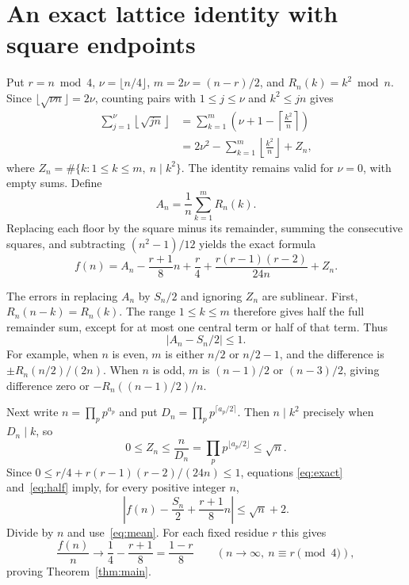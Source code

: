 \documentclass[11pt]{article}
\newcommand{\fl}[1]{\left\lfloor#1\right\rfloor}
\begin{document}
\section*{An exact lattice identity with square endpoints}
Put $r=n\bmod4$, $\nu=\lfloor n/4\rfloor$, $m=2\nu=(n-r)/2$,
and $R_n(k)=k^2\bmod n$. Since
$\lfloor\sqrt{\nu n}\rfloor=2\nu$, counting pairs with
$1\le j\le\nu$ and $k^2\le jn$ gives
\begin{align*}
 \sum_{j=1}^{\nu}\fl{\sqrt{jn}}
 &=\sum_{k=1}^{m}\left(\nu+1-\left\lceil\frac{k^2}{n}\right\rceil\right)\\
 &=2\nu^2-\sum_{k=1}^{m}\fl{\frac{k^2}{n}}+Z_n,
\end{align*}
where $Z_n=\#\{k:1\le k\le m,\ n\mid k^2\}$.
The identity remains valid for $\nu=0$, with empty sums.
Define
\[
 A_n=\frac1n\sum_{k=1}^{m}R_n(k).
\]
Replacing each floor by the square minus its remainder, summing the
consecutive squares, and subtracting $(n^2-1)/12$ yields the exact formula
\begin{equation}\label{eq:exact}
 f(n)=A_n-\frac{r+1}{8}n+\frac r4+
              \frac{r(r-1)(r-2)}{24n}+Z_n.
\end{equation}

The errors in replacing $A_n$ by $S_n/2$ and ignoring $Z_n$ are
sublinear. First, $R_n(n-k)=R_n(k)$. The range $1\le k\le m$
therefore gives half the full remainder sum, except for at most one
central term or half of that term. Thus
\begin{equation}\label{eq:half}
 |A_n-S_n/2|\le1.
\end{equation}
For example, when $n$ is even, $m$ is either $n/2$ or $n/2-1$,
and the difference is $\pm R_n(n/2)/(2n)$. When $n$ is odd, $m$
is $(n-1)/2$ or $(n-3)/2$, giving difference zero or
$-R_n((n-1)/2)/n$.

Next write $n=\prod_p p^{a_p}$ and put
$D_n=\prod_p p^{\lceil a_p/2\rceil}$. Then $n\mid k^2$ precisely
when $D_n\mid k$, so
\[
 0\le Z_n\le\frac n{D_n}
 =\prod_p p^{\lfloor a_p/2\rfloor}\le\sqrt n.
\]
Since $0\le r/4+r(r-1)(r-2)/(24n)\le1$, equations
\eqref{eq:exact} and~\eqref{eq:half} imply, for every positive integer $n$,
\[
 \left|f(n)-\frac{S_n}{2}+\frac{r+1}{8}n\right|
 \le\sqrt n+2.
\]
Divide by $n$ and use~\eqref{eq:mean}. For each fixed residue $r$ this gives
\[
 \frac{f(n)}n\longrightarrow\frac14-\frac{r+1}{8}
 =\frac{1-r}{8}\qquad(n\to\infty,\ n\equiv r\pmod4),
\]
proving Theorem~\ref{thm:main}.
\end{document}
